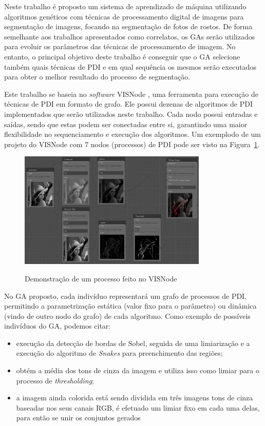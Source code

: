 \documentclass[12pt,oneside,a4paper,english,french,spanish,brazil,]{abntex2}
\begin{document}
Neste trabalho é proposto um sistema de aprendizado de máquina utilizando algoritmos genéticos com técnicas de processamento digital de imagens para segmentação de imagens, focando na segmentação de fotos de rostos. De forma semelhante aos trabalhos apresentados como correlatos, os GAs serão utilizados para evoluir os parâmetros das técnicas de processamento de imagem. No entanto, o principal objetivo deste trabalho é conseguir que o GA selecione também quais técnicas de PDI e em qual sequência os mesmos serão executados para obter o melhor resultado do processo de segmentação.

Este trabalho se baseia no \textit{software} VISNode \cite{visnode:2018}, uma ferramenta para execução de técnicas de PDI em formato de grafo. Ele possui dezenas de algoritmos de PDI implementados que serão utilizados neste trabalho. Cada nodo possui entradas e saídas, sendo que estas podem ser conectadas entre si, garantindo uma maior flexibilidade no sequenciamento e execução dos algoritmos. Um exemplodo de um projeto do VISNode com 7 nodos (processos) de PDI pode ser visto na Figura~\ref{fig:PRO_Visnode}.

\begin{figure}[ht]
\centering
\caption{Demonstração de um processo feito no VISNode}
\includegraphics[width=0.8\textwidth]{imagens/PRO_Visnode.PNG}
\sourceAuthor
\label{fig:PRO_Visnode}
\end{figure}

No GA proposto, cada indivíduo representará um grafo de processos de PDI, permitindo a parametrização estática (valor fixo para o parâmetro) ou dinâmica (vindo de outro nodo do grafo) de cada algoritmo. Como exemplo de possíveis indivíduos do GA, podemos citar:
\begin{itemize}
    \item execução da detecção de bordas de Sobel, seguida de uma limiarização e a execução do algoritmo de \textit{Snakes} para preenchimento das regiões;
    \item obtém a média dos tons de cinza da imagem e utiliza isso como limiar para o processo de \textit{thresholding};
    \item a imagem ainda colorida está sendo dividida em três imagens tons de cinza baseadas nos seus canais RGB, é efetuado um limiar fixo em cada uma delas, para então se unir os conjuntos gerados
\end{itemize}
\end{document}
